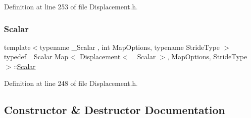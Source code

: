 Definition at line 253 of file Displacement.\+h.

\hypertarget{class_map_3_01_displacement_3_01___scalar_01_4_00_01_map_options_00_01_stride_type_01_4_a1558058db0e90cb7253d6b2dbf414099}{}\label{class_map_3_01_displacement_3_01___scalar_01_4_00_01_map_options_00_01_stride_type_01_4_a1558058db0e90cb7253d6b2dbf414099} 
\subsubsection{\texorpdfstring{Scalar}{Scalar}}
{\footnotesize\ttfamily template$<$typename \+\_\+\+Scalar , int Map\+Options, typename Stride\+Type $>$ \\
typedef \+\_\+\+Scalar \hyperlink{class_map_3_01_displacement_3_01___scalar_01_4_00_01_map_options_00_01_stride_type_01_4_a7355e77dc9b91bd8cb68f20847318f0f}{Map}$<$ \hyperlink{class_displacement}{Displacement}$<$ \+\_\+\+Scalar $>$, Map\+Options, Stride\+Type $>$\+::\hyperlink{class_map_3_01_displacement_3_01___scalar_01_4_00_01_map_options_00_01_stride_type_01_4_a1558058db0e90cb7253d6b2dbf414099}{Scalar}\hspace{0.3cm}{\ttfamily [protected]}}



Definition at line 248 of file Displacement.\+h.



\subsection{Constructor \& Destructor Documentation}
\hypertarget{class_map_3_01_displacement_3_01___scalar_01_4_00_01_map_options_00_01_stride_type_01_4_a7355e77dc9b91bd8cb68f20847318f0f}{}\label{class_map_3_01_displacement_3_01___scalar_01_4_00_01_map_options_00_01_stride_type_01_4_a7355e77dc9b91bd8cb68f20847318f0f} 
